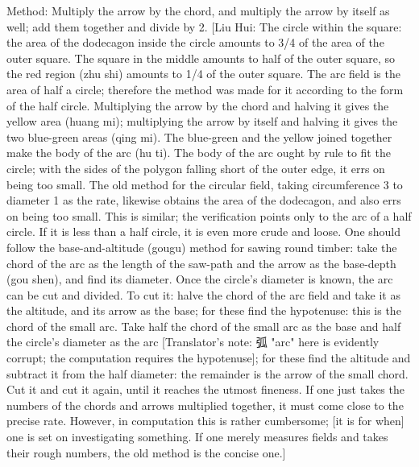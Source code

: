 \documentclass[11pt]{article}
\newenvironment{uniten}{\par\small\color{black!85}}{\par\medskip}
\begin{document}
\begin{uniten}Method: Multiply the arrow by the chord, and multiply the arrow by itself as well; add them together and divide by 2. [Liu Hui: The circle within the square: the area of the dodecagon inside the circle amounts to 3/4 of the area of the outer square. The square in the middle amounts to half of the outer square, so the red region (zhu shi) amounts to 1/4 of the outer square. The arc field is the area of half a circle; therefore the method was made for it according to the form of the half circle. Multiplying the arrow by the chord and halving it gives the yellow area (huang mi); multiplying the arrow by itself and halving it gives the two blue-green areas (qing mi). The blue-green and the yellow joined together make the body of the arc (hu ti). The body of the arc ought by rule to fit the circle; with the sides of the polygon falling short of the outer edge, it errs on being too small. The old method for the circular field, taking circumference 3 to diameter 1 as the rate, likewise obtains the area of the dodecagon, and also errs on being too small. This is similar; the verification points only to the arc of a half circle. If it is less than a half circle, it is even more crude and loose. One should follow the base-and-altitude (gougu) method for sawing round timber: take the chord of the arc as the length of the saw-path and the arrow as the base-depth (gou shen), and find its diameter. Once the circle's diameter is known, the arc can be cut and divided. To cut it: halve the chord of the arc field and take it as the altitude, and its arrow as the base; for these find the hypotenuse: this is the chord of the small arc. Take half the chord of the small arc as the base and half the circle's diameter as the arc [Translator's note: 弧 "arc" here is evidently corrupt; the computation requires the hypotenuse]; for these find the altitude and subtract it from the half diameter: the remainder is the arrow of the small chord. Cut it and cut it again, until it reaches the utmost fineness. If one just takes the numbers of the chords and arrows multiplied together, it must come close to the precise rate. However, in computation this is rather cumbersome; [it is for when] one is set on investigating something. If one merely measures fields and takes their rough numbers, the old method is the concise one.]\end{uniten}
\end{document}
